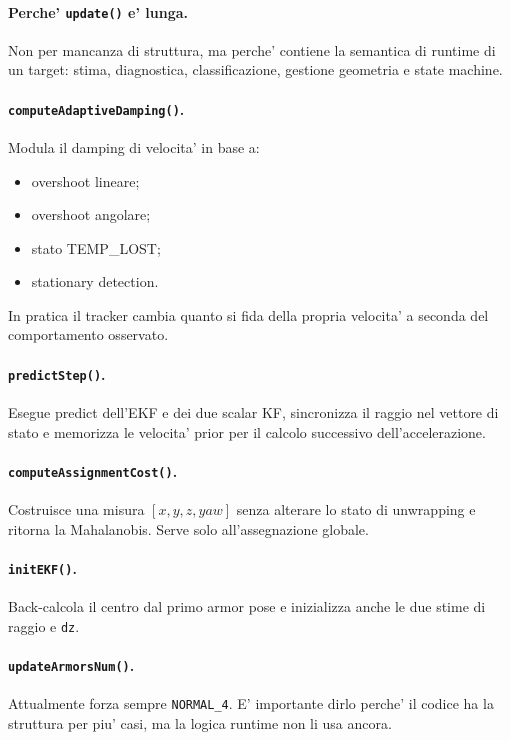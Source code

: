 \documentclass[11pt,a4paper]{article}
\newcommand{\code}[1]{\texttt{#1}}
\begin{document}
\paragraph{Perche' \code{update()} e' lunga.}
Non per mancanza di struttura, ma perche' contiene la semantica di runtime di un target: stima, diagnostica, classificazione, gestione geometria e state machine.

\paragraph{\code{computeAdaptiveDamping()}.}
Modula il damping di velocita' in base a:
\begin{itemize}[leftmargin=1.4em]
  \item overshoot lineare;
  \item overshoot angolare;
  \item stato TEMP\_LOST;
  \item stationary detection.
\end{itemize}

In pratica il tracker cambia quanto si fida della propria velocita' a seconda del comportamento osservato.

\paragraph{\code{predictStep()}.}
Esegue predict dell'EKF e dei due scalar KF, sincronizza il raggio nel vettore di stato e memorizza le velocita' prior per il calcolo successivo dell'accelerazione.

\paragraph{\code{computeAssignmentCost()}.}
Costruisce una misura \([x,y,z,yaw]\) senza alterare lo stato di unwrapping e ritorna la Mahalanobis. Serve solo all'assegnazione globale.

\paragraph{\code{initEKF()}.}
Back-calcola il centro dal primo armor pose e inizializza anche le due stime di raggio e \code{dz}.

\paragraph{\code{updateArmorsNum()}.}
Attualmente forza sempre \code{NORMAL\_4}. E' importante dirlo perche' il codice ha la struttura per piu' casi, ma la logica runtime non li usa ancora.
\end{document}
